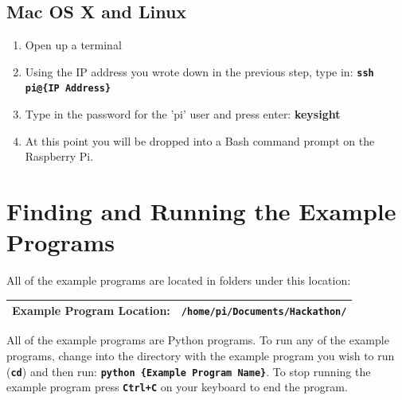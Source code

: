 \documentclass{article}
\def\code#1{\textbf{\texttt{#1}}}
\begin{document}
	\subsection{Mac OS X and Linux}
	
		\begin{enumerate}[1.)]
			\item Open up a terminal
			
			\item Using the IP address you wrote down in the previous step, type in: \code{ssh pi@\{IP Address\}}
			
			\item Type in the password for the 'pi' user and press enter: \textbf{keysight}
			
			\item At this point you will be dropped into a Bash command prompt on the Raspberry Pi.
			
		\end{enumerate}





\section{Finding and Running the Example Programs}

All of the example programs are located in folders under this location:

	\begin{center}
		\begin{tabular}{| l | c |}
			\hline
			\textbf{Example Program Location:} & \code{/home/pi/Documents/Hackathon/} \\
			\hline
		\end{tabular}
	\end{center}

All of the example programs are Python programs. To run any of the example programs, change into the directory with the example program you wish to run (\code{cd}) and then run: \code{python \{Example Program Name\}}. To stop running the example program press \code{Ctrl+C} on your keyboard to end the program.




\end{document}
